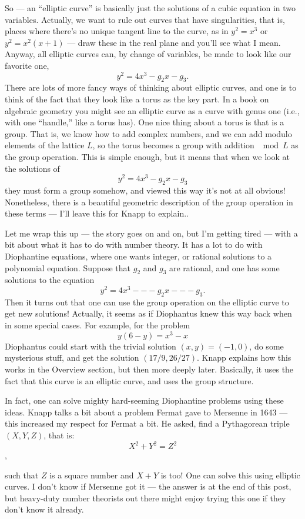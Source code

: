 \documentclass{article}
\begin{document}
So --- an ``elliptic curve'' is basically just the solutions of a cubic
equation in two variables. Actually, we want to rule out curves that
have singularities, that is, places where there's no unique tangent line
to the curve, as in \(y^2 = x^3\) or \(y^2 = x^2(x+1)\) --- draw these
in the real plane and you'll see what I mean. Anyway, all elliptic
curves can, by change of variables, be made to look like our favorite
one, \[y^2 = 4x^3 -g_2 x -g_3.\] There are lots of more fancy ways of
thinking about elliptic curves, and one is to think of the fact that
they look like a torus as the key part. In a book on algebraic geometry
you might see an elliptic curve as a curve with genus one (i.e., with
one ``handle,'' like a torus has). One nice thing about a torus is that
is a group. That is, we know how to add complex numbers, and we can add
modulo elements of the lattice \(L\), so the torus becomes a group with
addition \(\mod L\) as the group operation. This is simple enough, but
it means that when we look at the solutions of
\[y^2 = 4x^3 -g_2 x -g_3\] they must form a group somehow, and viewed
this way it's not at all obvious! Nonetheless, there is a beautiful
geometric description of the group operation in these terms --- I'll
leave this for Knapp to explain..

Let me wrap this up --- the story goes on and on, but I'm getting tired
--- with a bit about what it has to do with number theory. It has a lot
to do with Diophantine equations, where one wants integer, or rational
solutions to a polynomial equation. Suppose that \(g_2\) and \(g_3\) are
rational, and one has some solutions to the equation
\[y^2 = 4x^3 --- g_2 x --- g_3.\] Then it turns out that one can use the
group operation on the elliptic curve to get new solutions! Actually, it
seems as if Diophantus knew this way back when in some special cases.
For example, for the problem \[y(6 -y) = x^3 -x\] Diophantus could start
with the trivial solution \((x,y) = (-1,0)\), do some mysterious stuff,
and get the solution \((17/9,26/27)\). Knapp explains how this works in
the Overview section, but then more deeply later. Basically, it uses the
fact that this curve is an elliptic curve, and uses the group structure.

In fact, one can solve mighty hard-seeming Diophantine problems using
these ideas. Knapp talks a bit about a problem Fermat gave to Mersenne
in 1643 --- this increased my respect for Fermat a bit. He asked, find a
Pythagorean triple \((X,Y,Z)\), that is: \[X^2 + Y^2 = Z^2\],

such that \(Z\) is a square number and \(X + Y\) is too! One can solve
this using elliptic curves. I don't know if Mersenne got it --- the
answer is at the end of this post, but heavy-duty number theorists out
there might enjoy trying this one if they don't know it already.
\end{document}
